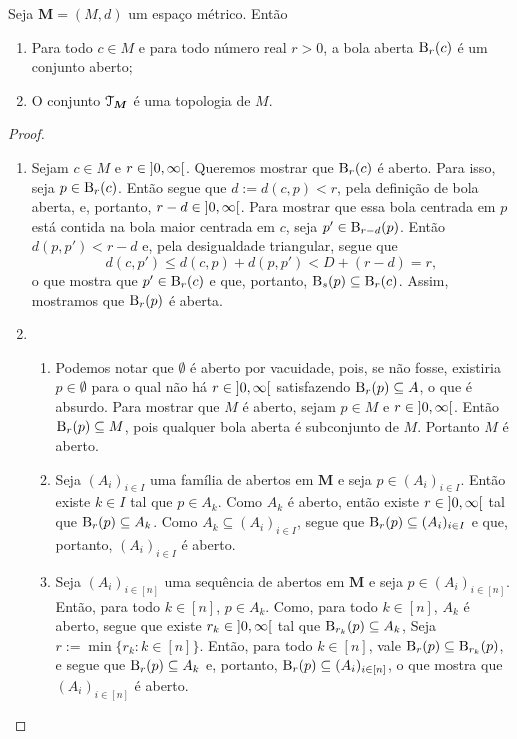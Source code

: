 \begin{proposition}
Seja $\bm M = (M,d)$ um espaço métrico. Então
	\begin{enumerate}
	\item Para todo $c \in M$ e para todo número real $r > 0$, a bola aberta $\mathrm{B}_r(c)$ é um conjunto aberto;
	\item O conjunto $\mathcal{T}_{\bm M}$ é uma topologia de $M$.
	\end{enumerate}
\end{proposition}
\begin{proof}
	\begin{enumerate}
	\item Sejam $c \in M$ e $r \in \left]{0},{\infty}\right[$. Queremos mostrar que $\mathrm{B}_r(c)$ é aberto. Para isso, seja $p \in \mathrm{B}_r(c)$. Então segue que $d := d(c,p) < r$, pela definição de bola aberta, e, portanto, $r-d \in \left]{0},{\infty}\right[$. Para mostrar que essa bola centrada em $p$ está contida na bola maior centrada em $c$, seja $p' \in \mathrm{B}_{r-d}(p)$. Então $d(p,p')<r-d$ e, pela desigualdade triangular, segue que
	\begin{equation*}
	d(c,p') \leq d(c,p) + d(p,p') < D + (r-d) = r,
	\end{equation*}
o que mostra que $p' \in \mathrm{B}_r(c)$ e que, portanto, $\mathrm{B}_s(p) \subseteq \mathrm{B}_r(c)$. Assim, mostramos que $\mathrm{B}_r(p)$ é aberta.
	
	\item
		\begin{enumerate}
		\item Podemos notar que $\emptyset$ é aberto por vacuidade, pois, se não fosse, existiria $p \in \emptyset$ para o qual não há $r \in \left]{0},{\infty}\right[$ satisfazendo $\mathrm{B}_r(p) \subseteq A$, o que é absurdo.
	Para mostrar que $M$ é aberto, sejam $p \in M$ e $r \in \left]{0},{\infty}\right[$. Então $\mathrm{B}_r(p) \subseteq M$, pois qualquer bola aberta é subconjunto de $M$. Portanto $M$ é aberto.
	
		\item Seja $(A_i)_{i \in I}$ uma família de abertos em $\bm M$ e seja $p \in (A_i)_{i \in I}$. Então existe $k \in I$ tal que $p \in A_k$. Como $A_k$ é aberto, então existe $r \in \left]{0},{\infty}\right[$ tal que $\mathrm{B}_r(p) \subseteq A_k$. Como $A_k \subseteq (A_i)_{i \in I}$, segue que $\mathrm{B}_r(p) \subseteq (A_i)_{i \in I}$ e que, portanto, $(A_i)_{i \in I}$ é aberto.
	
		\item Seja $(A_i)_{i \in [n]}$ uma sequência de abertos em $\bm M$ e seja $p \in (A_i)_{i \in [n]}$. Então, para todo $k \in [n]$, $p \in A_k$. Como, para todo $k \in [n]$, $A_k$ é aberto, segue que existe $r_k \in \left]{0},{\infty}\right[$ tal que $\mathrm{B}_{r_k}(p) \subseteq A_k$, Seja $r := \min \{r_k : k \in [n]\}$. Então, para todo $k \in [n]$, vale $\mathrm{B}_r(p) \subseteq \mathrm{B}_{r_k}(p)$, e segue que $\mathrm{B}_r(p) \subseteq A_k$ e, portanto, $\mathrm{B}_r(p) \subseteq (A_i)_{i \in [n]}$, o que mostra que $(A_i)_{i \in [n]}$ é aberto.
		\end{enumerate}		
	\end{enumerate}
\end{proof}

